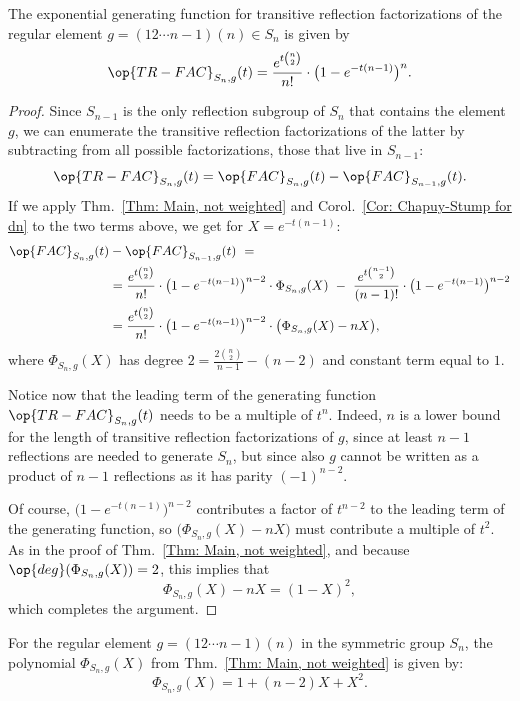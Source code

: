 \begin{prop}\label{Prop: transitive factorizations enum.}
The exponential generating function for transitive reflection factorizations of the regular element $g=(12\cdots n-1)(n)\in S_n$ is given by $$\op{TR-FAC}_{S_n,g}(t)=\dfrac{e^{t\binom{n}{2}}}{n!}\cdot \big( 1-e^{-t(n-1)}\big)^{n}. $$
\end{prop}
\begin{proof}
Since $S_{n-1}$ is the only reflection subgroup of $S_n$ that contains the element $g$, we can enumerate the transitive reflection factorizations of the latter by subtracting from all possible factorizations, those that live in $S_{n-1}$:$$
\op{TR-FAC}_{S_n,g}(t)=\op{FAC}_{S_n,g}(t)-\op{FAC}_{S_{n-1},g}(t).$$ If we apply Thm.~\ref{Thm: Main, not weighted} and Corol.~\ref{Cor: Chapuy-Stump for dn} to the two terms above, we get for $X=e^{-t(n-1)}$:
\begin{align*}
\op{FAC}_{S_n,g}(t)&-\op{FAC}_{S_{n-1},g}(t)\ =\\
&= \dfrac{e^{t\binom{n}{2}}}{n!}\cdot \big(1-e^{-t(n-1)}\big)^{n-2}\cdot\Phi_{S_n,g}(X) \ - \ \dfrac{e^{t\binom{n-1}{2}}}{(n-1)!}\cdot \big( 1-e^{-t(n-1)}\big)^{n-2}\\
&= \dfrac{e^{t\binom{n}{2}}}{n!}\cdot\big(1-e^{-t(n-1)}\big)^{n-2}\cdot\big( \Phi_{S_n,g}(X)-nX\big),
\end{align*}where $\Phi_{S_n,g}(X)$ has degree $2=\frac{2\binom{n}{2}}{n-1}-(n-2)$ and constant term equal to $1$.

Notice now that the leading term of the generating function $\op{TR-FAC}_{S_n,g}(t)$ needs to be a multiple of $t^n$. Indeed, $n$ is a lower bound for the length of transitive reflection factorizations of $g$, since at least $n-1$ reflections are needed to generate $S_n$, but since also $g$ cannot be written as a product of $n-1$ reflections as it has parity $(-1)^{n-2}$.

Of course, $\big( 1-e^{-t(n-1)}\big)^{n-2}$ contributes a factor of $t^{n-2}$ to the leading term of the generating function, so $\big(\Phi_{S_n,g}(X)-nX\big)$ must contribute a multiple of $t^2$. As in the proof of Thm.~\ref{Thm: Main, not weighted}, and because $\op{deg}(\Phi_{S_n,g}(X))=2$, this implies that $$\Phi_{S_n,g}(X)-nX=(1-X)^2,$$ which completes the argument.
\end{proof}


\begin{coro}\label{Corol: last of theorem}
For the regular element $g=(12\cdots n-1)(n)$ in the symmetric group $S_n$, the polynomial $\Phi_{S_n,g}(X)$ from Thm.~\ref{Thm: Main, not weighted} is given by:$$
\Phi_{S_n,g}(X)=1+(n-2)X+X^2.$$
\end{coro}

